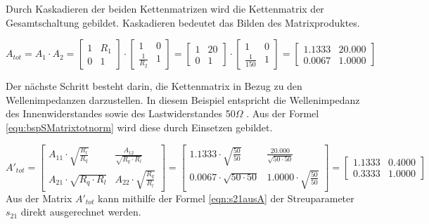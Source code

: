 Durch Kaskadieren der beiden Kettenmatrizen wird die Kettenmatrix der Gesamtschaltung gebildet. Kaskadieren bedeutet das Bilden des Matrixproduktes.

\begin{equation}\label{equ:bspSMatrixtot}
A_{tot} = A_1 \cdot A_2 = \left[\begin{matrix}
			1&R_1\\0&1
			\end{matrix}\right] \cdot  \left[\begin{matrix}
			1&0\\\frac{1}{R_2}&1
			\end{matrix}\right]
			= \left[\begin{matrix}
			1&20\\0&1
			\end{matrix}\right] \cdot \left[\begin{matrix}
			1&0\\\frac{1}{150}&1
			\end{matrix}\right] =
			\left[\begin{matrix}
			1.1333&20.000\\0.0067&1.0000
			\end{matrix}\right]
\end{equation}

Der nächste Schritt besteht darin, die Kettenmatrix in Bezug zu den Wellenimpedanzen darzustellen. In diesem Beispiel entspricht die Wellenimpedanz des Innenwiderstandes sowie des Lastwiderstandes 50$\Omega$ . Aus der Formel \ref{equ:bspSMatrixtotnorm}  wird diese durch Einsetzen gebildet.

\begin{equation}\label{equ:bspSMatrixtotnorm}
			A'_{tot} = \left[\begin{matrix}
			A_{11}\cdot\sqrt{ \frac{ R_{ l } }{ R_{ q } } }
			&
			\frac{A_{12}}{\sqrt{R_q \cdot R_l}}
			\\
			A_{21} \cdot \sqrt{R_q \cdot R_l}
			&
			A_{22} \cdot \sqrt{\frac{R_q}{R_l}}
			\end{matrix}\right]
			=
			\left[\begin{matrix}
			1.1333\cdot\sqrt{ \frac{ 50}{50} }
			&
			\frac{20.000}{\sqrt{50\cdot 50}}
			\\
			0.0067 \cdot \sqrt{50 \cdot 50}
			&
			1.0000 \cdot \sqrt{\frac{50}{50}}
			\end{matrix}\right]
			=
			\left[\begin{matrix}
			1.1333
			&
			0.4000
			\\
			0.3333
			&
			1.0000
			\end{matrix}\right]
\end{equation}
Aus der Matrix $A'_{tot}$ kann mithilfe der Formel \ref{eqn:s21ausA} der Streuparameter $s_{21}$ direkt ausgerechnet werden.

